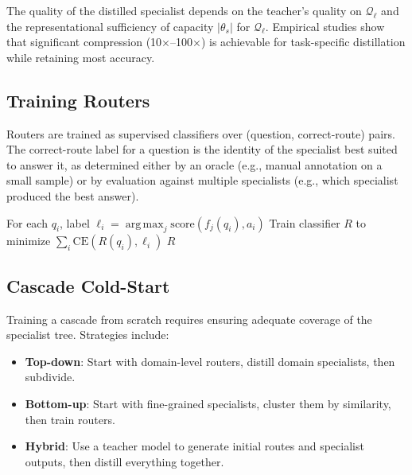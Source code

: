 \documentclass[11pt,twocolumn,a4paper]{article}
\theoremstyle{definition}
\theoremstyle{remark}
\DeclareMathOperator*{\argmax}{arg\,max}
\begin{document}
The quality of the distilled specialist depends on the teacher's quality on $\mathcal{Q}_\ell$ and the representational sufficiency of capacity $|\theta_s|$ for $\mathcal{Q}_\ell$. Empirical studies \citep{sanh2019distilbert, jiao2020tinybert} show that significant compression (10$\times$--100$\times$) is achievable for task-specific distillation while retaining most accuracy.

\subsection{Training Routers}

Routers are trained as supervised classifiers over (question, correct-route) pairs. The correct-route label for a question is the identity of the specialist best suited to answer it, as determined either by an oracle (e.g., manual annotation on a small sample) or by evaluation against multiple specialists (e.g., which specialist produced the best answer).

\begin{algorithm}
\caption{Router Training}
\label{alg:train-router}
\begin{algorithmic}[1]
    \State For each $q_i$, label $\ell_i = \argmax_j \mathrm{score}(f_j(q_i), a_i)$
    \State Train classifier $R$ to minimize $\sum_i \mathrm{CE}(R(q_i), \ell_i)$
    \State \Return $R$
\EndFunction
\end{algorithmic}
\end{algorithm}

\subsection{Cascade Cold-Start}

Training a cascade from scratch requires ensuring adequate coverage of the specialist tree. Strategies include:
\begin{itemize}
    \item \textbf{Top-down}: Start with domain-level routers, distill domain specialists, then subdivide.
    \item \textbf{Bottom-up}: Start with fine-grained specialists, cluster them by similarity, then train routers.
    \item \textbf{Hybrid}: Use a teacher model to generate initial routes and specialist outputs, then distill everything together.
\end{itemize}
\end{document}

